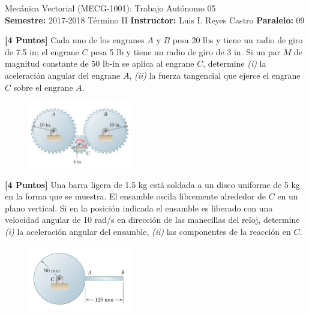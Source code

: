 \documentclass[ a4paper, twoside, 11pt]{article}
\newcommand{\numero}{05}
\begin{document}
\allowdisplaybreaks

\begin{center}
\Large Mec\'anica Vectorial (MECG-1001): Trabajo Aut\'onomo \numero \\[2ex]
\small \textbf{Semestre:} 2017-2018 T\'ermino II \qquad
\textbf{Instructor:} Luis I. Reyes Castro \qquad
\textbf{Paralelo:} 09
\end{center}
\fullskip

\begin{problem}
\textbf{[4 Puntos]} Cada uno de los engranes $A$ y $B$ pesa 20 lbs y tiene un radio de giro de 7.5 in; el engrane $C$ pesa 5 lb y tiene un radio de giro de 3 in. Si un par $M$ de magnitud constante de 50 lb-in se aplica al engrane $C$, determine \textit{(i)} la aceleraci\'on angular del engrane $A$, \linebreak \textit{(ii)} la fuerza tangencial que ejerce el engrane $C$ sobre el engrane $A$.

\begin{figure}[htb]
\centering
\includegraphics[width=0.4\textwidth]{problema-1.jpg}
\end{figure}

\end{problem}
\fullskip

\begin{problem}
\textbf{[4 Puntos]} Una barra ligera de 1.5 kg est\'a soldada a un disco uniforme de 5 kg en la forma que se muestra. El ensamble oscila libremente alrededor de $C$ en un plano vertical. Si en la posici\'on indicada el ensamble es liberado con una velocidad angular de 10 rad/s \linebreak en direcci\'on de las manecillas del reloj, determine \textit{(i)} la aceleraci\'on angular del ensamble, \linebreak \textit{(ii)} las componentes de la reacci\'on en $C$. 

\begin{figure}[htb]
\centering
\includegraphics[width=0.4\textwidth]{problema-2.jpg}
\end{figure}

\end{problem}
\fullskip
\end{document}
